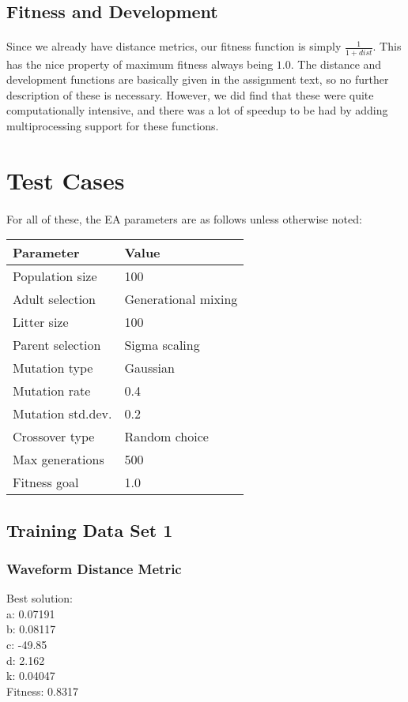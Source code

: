 \documentclass[a4paper,12pt]{article}
\begin{document}
\subsection{Fitness and Development}

\paragraph{}Since we already have distance metrics, our fitness function is simply $\frac{1}{1+dist}$. This has the nice property of maximum fitness always being $1.0$. The distance and development functions are basically given in the assignment text, so no further description of these is necessary. However, we did find that these were quite computationally intensive, and there was a lot of speedup to be had by adding multiprocessing support for these functions.

\section{Test Cases}

\paragraph{}For all of these, the EA parameters are as follows unless otherwise noted:\\

\begin{tabular}{ll}
\hline
Parameter & Value \\
\hline \hline
Population size & 100 \\
Adult selection & Generational mixing \\
Litter size & 100 \\
Parent selection & Sigma scaling \\
Mutation type & Gaussian \\
Mutation rate & 0.4 \\
Mutation std.dev. & 0.2 \\
Crossover type & Random choice \\
Max generations & 500 \\
Fitness goal & 1.0 \\
\hline
\end{tabular}

\subsection{Training Data Set 1}
\subsubsection{Waveform Distance Metric}
Best solution: \\
a: 0.07191 \\
b: 0.08117 \\
c: -49.85 \\
d: 2.162 \\
k: 0.04047 \\
Fitness: 0.8317
\end{document}
